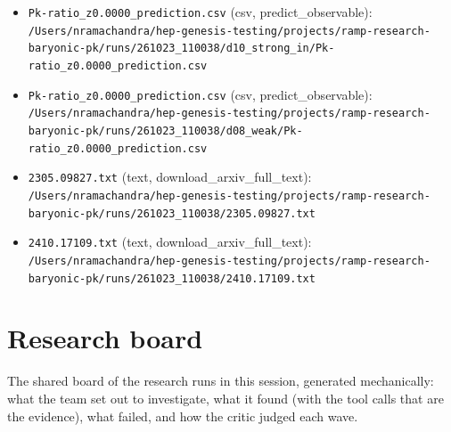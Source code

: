 \documentclass[11pt,a4paper]{article}
\begin{document}
\begin{itemize}
  \item \texttt{Pk-ratio\_\allowbreak{}z0.0000\_\allowbreak{}prediction.csv} (csv, predict\_observable): \texttt{/\allowbreak{}Users/\allowbreak{}nramachandra/\allowbreak{}hep-genesis-testing/\allowbreak{}projects/\allowbreak{}ramp-research-baryonic-pk/\allowbreak{}runs/\allowbreak{}261023\_\allowbreak{}110038/\allowbreak{}d10\_\allowbreak{}strong\_\allowbreak{}in/\allowbreak{}Pk-ratio\_\allowbreak{}z0.0000\_\allowbreak{}prediction.csv}
  \item \texttt{Pk-ratio\_\allowbreak{}z0.0000\_\allowbreak{}prediction.csv} (csv, predict\_observable): \texttt{/\allowbreak{}Users/\allowbreak{}nramachandra/\allowbreak{}hep-genesis-testing/\allowbreak{}projects/\allowbreak{}ramp-research-baryonic-pk/\allowbreak{}runs/\allowbreak{}261023\_\allowbreak{}110038/\allowbreak{}d08\_\allowbreak{}weak/\allowbreak{}Pk-ratio\_\allowbreak{}z0.0000\_\allowbreak{}prediction.csv}
  \item \texttt{2305.09827.txt} (text, download\_arxiv\_full\_text): \texttt{/\allowbreak{}Users/\allowbreak{}nramachandra/\allowbreak{}hep-genesis-testing/\allowbreak{}projects/\allowbreak{}ramp-research-baryonic-pk/\allowbreak{}runs/\allowbreak{}261023\_\allowbreak{}110038/\allowbreak{}2305.09827.txt}
  \item \texttt{2410.17109.txt} (text, download\_arxiv\_full\_text): \texttt{/\allowbreak{}Users/\allowbreak{}nramachandra/\allowbreak{}hep-genesis-testing/\allowbreak{}projects/\allowbreak{}ramp-research-baryonic-pk/\allowbreak{}runs/\allowbreak{}261023\_\allowbreak{}110038/\allowbreak{}2410.17109.txt}
\end{itemize}

\section{Research board}
\label{app:board}
The shared board of the research runs in this session, generated mechanically: what the team set out to investigate, what it found (with the tool calls that are the evidence), what failed, and how the critic judged each wave.
\end{document}
